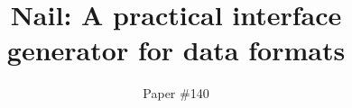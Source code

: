 \documentclass[10pt,twocolumn]{article}
\begin{document}
\author{Paper \#140}
\date{}
\title{Nail: A practical interface generator for data formats}

\maketitle










% 



\end{document}

